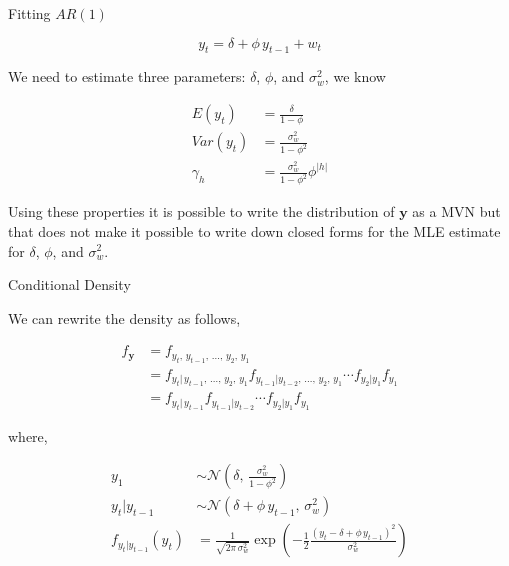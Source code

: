 \documentclass[11pt,ignorenonframetext,]{beamer}
\begin{document}
\begin{frame}[t]{%
\protect\hypertarget{fitting-ar1}{%
Fitting \(AR(1)\)}}

\[ y_t = \delta + \phi \, y_{t-1} + w_t \]

We need to estimate three parameters: \(\delta\), \(\phi\), and
\(\sigma_w^2\), we know

\[ 
\begin{aligned}
E(y_t) &= \frac{\delta}{1-\phi} \\
Var(y_t) &= \frac{\sigma_w^2}{1-\phi^2} \\
\gamma_h &= \frac{\sigma_w^2}{1-\phi^2} \phi^{|h|}
\end{aligned} 
\]

Using these properties it is possible to write the distribution of
\(\symbf{y}\) as a MVN but that does not make it possible to write down
closed forms for the MLE estimate for \(\delta\), \(\phi\), and
\(\sigma_w^2\).

\end{frame}

\begin{frame}{%
\protect\hypertarget{conditional-density}{%
Conditional Density}}

We can rewrite the density as follows,

\[
\begin{aligned}
f_{\symbf y}
  &= f_{y_t,\,y_{t-1},\,\ldots,\,y_2,\,y_1} \\
  &= f_{y_t|\,y_{t-1},\,\ldots,\,y_2,\,y_1} f_{y_{t-1}|y_{t-2},\,\ldots,\,y_2,\,y_1} \cdots f_{y_2|y_1} f_{y_1} \\
  &= f_{y_t|\,y_{t-1}} f_{y_{t-1}|y_{t-2}} \cdots f_{y_2|y_1} f_{y_1} 
\end{aligned}
\]

where,

\[
\begin{aligned}
y_1 &\sim \mathcal{N}\left(\delta, \, \frac{\sigma^2_w}{1-\phi^2} \right) \\
y_{t}|y_{t-1} &\sim \mathcal{N}\left(\delta+\phi\, y_{t-1}, \, \sigma^2_w \right) \\
f_{y_{t}|y_{t-1}}(y_t) &= \frac{1}{\sqrt{2\pi \, \sigma^2_w}} \exp \left( -\frac{1}{2}\frac{(y_t -\delta+\phi\, y_{t-1})^2 }{\sigma^2_w} \right)
\end{aligned}
\]

\end{frame}
\end{document}
